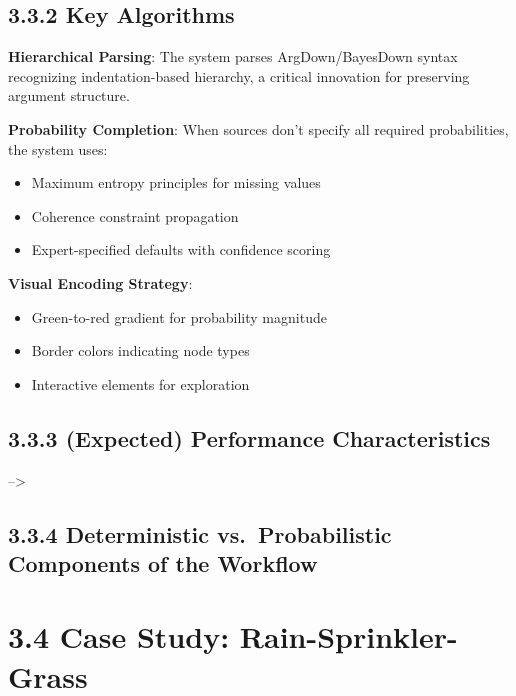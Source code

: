 \documentclass[
  11pt,
  letterpaper,
]{book}
\providecommand{\tightlist}{%
  \setlength{\itemsep}{0pt}\setlength{\parskip}{0pt}}
\begin{document}
\subsection*{3.3.2 Key Algorithms}\label{sec-key-algorithms}

\textbf{Hierarchical Parsing}: The system parses ArgDown/BayesDown
syntax recognizing indentation-based hierarchy, a critical innovation
for preserving argument structure.

\textbf{Probability Completion}: When sources don't specify all required
probabilities, the system uses:

\begin{itemize}
\tightlist
\item
  Maximum entropy principles for missing values
\item
  Coherence constraint propagation
\item
  Expert-specified defaults with confidence scoring
\end{itemize}

\textbf{Visual Encoding Strategy}:

\begin{itemize}
\tightlist
\item
  Green-to-red gradient for probability magnitude
\item
  Border colors indicating node types
\item
  Interactive elements for exploration
\end{itemize}

\subsection*{3.3.3 (Expected) Performance
Characteristics}\label{sec-performance}

--\textgreater{}

\subsection*{3.3.4 Deterministic vs.~Probabilistic Components of the
Workflow}\label{deterministic-vs.-probabilistic-components-of-the-workflow}

\section*{3.4 Case Study:
Rain-Sprinkler-Grass}\label{sec-case-rain-sprinkler}
\end{document}
